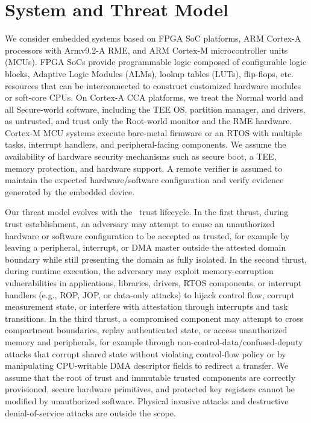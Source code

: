 \section{System and Threat Model}
\label{sec:system_threat}

We consider embedded systems based on FPGA SoC platforms, ARM Cortex-A processors with Armv9.2-A RME, and ARM Cortex-M microcontroller units (MCUs).
FPGA SoCs provide programmable logic composed of configurable logic blocks, Adaptive Logic Modules (ALMs), lookup tables (LUTs), flip-flops, etc. resources that can be interconnected to construct customized hardware modules or soft-core CPUs.
On Cortex-A CCA platforms, we treat the Normal world and all Secure-world software, including the TEE OS, partition manager, and drivers, as untrusted, and trust only the Root-world monitor and the RME hardware.
Cortex-M MCU systems execute bare-metal firmware or an RTOS with multiple tasks, interrupt handlers, and peripheral-facing components.
We assume the availability of hardware security mechanisms such as secure boot, a TEE, memory protection, and hardware support.
A remote verifier is assumed to maintain the expected hardware/software configuration and verify evidence generated by the embedded device.

Our threat model evolves with the \sys~trust lifecycle.
In the first thrust, during trust establishment, an adversary may attempt to cause an unauthorized hardware or software configuration to be accepted as trusted, for example by leaving a peripheral, interrupt, or DMA master outside the attested domain boundary while still presenting the domain as fully isolated.
In the second thrust, during runtime execution, the adversary may exploit memory-corruption vulnerabilities in applications, libraries, drivers, RTOS components, or interrupt handlers (e.g., ROP, JOP, or data-only attacks) to hijack control flow, corrupt measurement state, or interfere with attestation through interrupts and task transitions.
In the third thrust, a compromised component may attempt to cross compartment boundaries, replay authenticated state, or access unauthorized memory and peripherals, for example through non-control-data/confused-deputy attacks that corrupt shared state without violating control-flow policy or by manipulating CPU-writable DMA descriptor fields to redirect a transfer.
We assume that the root of trust and immutable trusted components are correctly provisioned, secure hardware primitives, and protected key registers cannot be modified by unauthorized software.
Physical invasive attacks and destructive denial-of-service attacks are outside the scope.